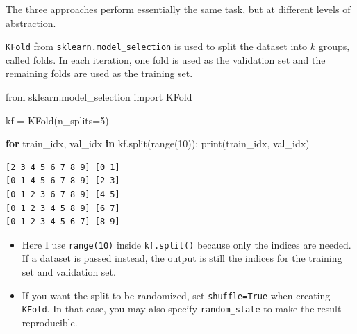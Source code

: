 \documentclass[
  letterpaper,
  DIV=11,
  numbers=noendperiod]{scrreprt}
\newenvironment{Shaded}{\begin{snugshade}}{\end{snugshade}}
\newcommand{\BuiltInTok}[1]{\textcolor[rgb]{0.00,0.23,0.31}{#1}}
\newcommand{\ControlFlowTok}[1]{\textcolor[rgb]{0.00,0.23,0.31}{\textbf{#1}}}
\newcommand{\DecValTok}[1]{\textcolor[rgb]{0.68,0.00,0.00}{#1}}
\newcommand{\ImportTok}[1]{\textcolor[rgb]{0.00,0.46,0.62}{#1}}
\newcommand{\KeywordTok}[1]{\textcolor[rgb]{0.00,0.23,0.31}{\textbf{#1}}}
\newcommand{\NormalTok}[1]{\textcolor[rgb]{0.00,0.23,0.31}{#1}}
\newcommand{\OperatorTok}[1]{\textcolor[rgb]{0.37,0.37,0.37}{#1}}
\providecommand{\tightlist}{%
  \setlength{\itemsep}{0pt}\setlength{\parskip}{0pt}}
\theoremstyle{definition}
\theoremstyle{definition}
\theoremstyle{plain}
\theoremstyle{plain}
\theoremstyle{remark}
\begin{document}
The three approaches perform essentially the same task, but at different
levels of abstraction.

\begin{tcolorbox}[enhanced jigsaw, arc=.35mm, bottomrule=.15mm, bottomtitle=1mm, breakable, colback=white, colbacktitle=quarto-callout-note-color!10!white, colframe=quarto-callout-note-color-frame, coltitle=black, left=2mm, leftrule=.75mm, opacityback=0, opacitybacktitle=0.6, rightrule=.15mm, title=\textcolor{quarto-callout-note-color}{\faInfo}\hspace{0.5em}{\texttt{KFold}}, titlerule=0mm, toprule=.15mm, toptitle=1mm]

\texttt{KFold} from \texttt{sklearn.model\_selection} is used to split
the dataset into \(k\) groups, called folds. In each iteration, one fold
is used as the validation set and the remaining folds are used as the
training set.

\begin{Shaded}
\begin{Highlighting}[]
\ImportTok{from}\NormalTok{ sklearn.model\_selection }\ImportTok{import}\NormalTok{ KFold}

\NormalTok{kf }\OperatorTok{=}\NormalTok{ KFold(n\_splits}\OperatorTok{=}\DecValTok{5}\NormalTok{)}

\ControlFlowTok{for}\NormalTok{ train\_idx, val\_idx }\KeywordTok{in}\NormalTok{ kf.split(}\BuiltInTok{range}\NormalTok{(}\DecValTok{10}\NormalTok{)):}
    \BuiltInTok{print}\NormalTok{(train\_idx, val\_idx)}
\end{Highlighting}
\end{Shaded}

\begin{verbatim}
[2 3 4 5 6 7 8 9] [0 1]
[0 1 4 5 6 7 8 9] [2 3]
[0 1 2 3 6 7 8 9] [4 5]
[0 1 2 3 4 5 8 9] [6 7]
[0 1 2 3 4 5 6 7] [8 9]
\end{verbatim}

\begin{itemize}
\tightlist
\item
  Here I use \texttt{range(10)} inside \texttt{kf.split()} because only
  the indices are needed. If a dataset is passed instead, the output is
  still the indices for the training set and validation set.
\item
  If you want the split to be randomized, set \texttt{shuffle=True} when
  creating \texttt{KFold}. In that case, you may also specify
  \texttt{random\_state} to make the result reproducible.
\end{itemize}


\end{tcolorbox}
\end{document}
